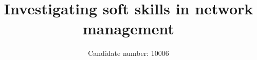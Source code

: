 \documentclass[12pt,journal,compsoc]{IEEEtran}
\begin{document}
%
\title{
Investigating soft skills in network management
}
%
%
%
%

\author{Candidate number: 10006}

\end{document}
